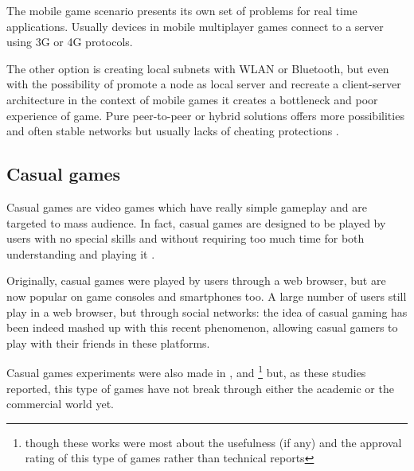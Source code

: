 The mobile game scenario presents its own set of problems for real time applications. 
Usually devices in mobile multiplayer games connect to a server using 3G or 4G protocols.

The other option is creating local subnets with WLAN or Bluetooth, but even with the 
possibility of promote a node as local server and recreate a client-server architecture
in the context of mobile games it creates a bottleneck and poor experience of game.
Pure peer-to-peer or hybrid solutions offers more possibilities and often stable networks
but usually lacks of cheating protections \cite{bib:can-mobile-gaming-be-improved} 
\cite{bib:study-mobile-phone-sector}. 

\subsection{Casual games}
Casual games are video games which have really simple gameplay and are
targeted to mass audience. In fact, casual games are designed to be played
by users with no special skills and without requiring too much time for both
understanding and playing it \cite{bib:mob-health-casual}.

Originally, casual games were played by users through a web browser, but are
now popular on game consoles and smartphones too. A large number of users still
play in a web browser, but through social networks: the idea of casual gaming
has been indeed mashed up with this recent phenomenon, allowing casual gamers to
play with their friends in these platforms.

Casual games experiments were also made in \cite{bib:ppav-casual},
\cite{bib:li-k-social-casual} and \cite{bib:mob-health-casual}\footnote{though
these works were most about the usefulness (if any) and the approval rating of
this type of games rather than technical reports} but, as these studies
reported, this type of games have not break through either the academic or the
commercial world yet.

